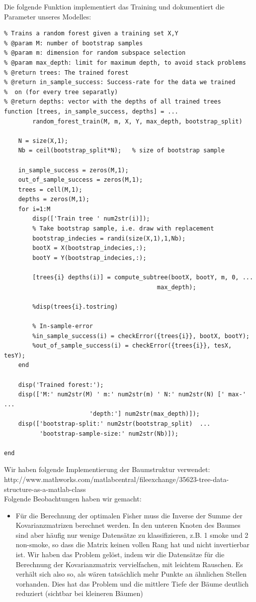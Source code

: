 \documentclass{article}
\begin{document}
Die folgende Funktion implementiert das Training und dokumentiert die Parameter unseres Modelles:

\begin{lstlisting}
% Trains a random forest given a training set X,Y
% @param M: number of bootstrap samples
% @param m: dimension for random subspace selection
% @param max_depth: limit for maximum depth, to avoid stack problems
% @return trees: The trained forest
% @return in_sample_success: Success-rate for the data we trained
%  on (for every tree separatly)
% @return depths: vector with the depths of all trained trees
function [trees, in_sample_success, depths] = ...
        random_forest_train(M, m, X, Y, max_depth, bootstrap_split)
    
    N = size(X,1);
    Nb = ceil(bootstrap_split*N);   % size of bootstrap sample

    in_sample_success = zeros(M,1);
    out_of_sample_success = zeros(M,1);
    trees = cell(M,1);
    depths = zeros(M,1);
    for i=1:M
        disp(['Train tree ' num2str(i)]);
        % Take bootstrap sample, i.e. draw with replacement
        bootstrap_indecies = randi(size(X,1),1,Nb);
        bootX = X(bootstrap_indecies,:);
        bootY = Y(bootstrap_indecies,:);
    
        [trees{i} depths(i)] = compute_subtree(bootX, bootY, m, 0, ...
                                           max_depth);
    
        %disp(trees{i}.tostring)

        % In-sample-error
        %in_sample_success(i) = checkError({trees{i}}, bootX, bootY);
        %out_of_sample_success(i) = checkError({trees{i}}, tesX, tesY);
    end

    disp('Trained forest:');
    disp(['M:' num2str(M) ' m:' num2str(m) ' N:' num2str(N) [' max-' ...
                        'depth:'] num2str(max_depth)]); 
    disp(['bootstrap-split:' num2str(bootstrap_split)  ...
          'bootstrap-sample-size:' num2str(Nb)]);

end

\end{lstlisting}

Wir haben folgende Implementierung der Baumstruktur verwendet:
http://www.mathworks.com/matlabcentral/fileexchange/35623-tree-data-structure-as-a-matlab-class\\

Folgende Beobachtungen haben wir gemacht:
\begin{itemize}
\item Für die Berechnung der optimalen Fisher muss die Inverse der Summe der Kovarianzmatrizen berechnet werden. In den unteren Knoten des Baumes sind aber häufig nur wenige Datensätze zu klassifizieren, z.B. 1 smoke und 2 non-smoke, so dass die Matrix keinen vollen Rang hat und nicht invertierbar ist. Wir haben das Problem gelöst, indem wir die Datensätze für die Berechnung der Kovarianzmatrix vervielfachen, mit leichtem Rauschen. Es verhält sich also so, als wären tatsächlich mehr Punkte an ähnlichen Stellen vorhanden. Dies hat das Problem und die mittlere Tiefe der Bäume deutlich reduziert (sichtbar bei kleineren Bäumen)
\end{itemize}
\end{document}
